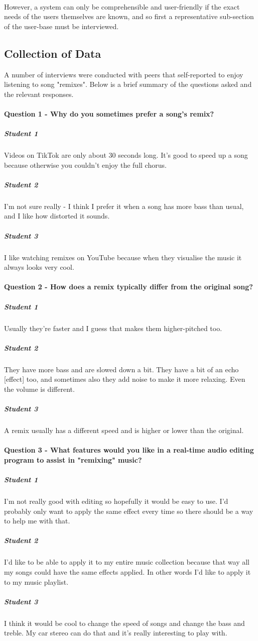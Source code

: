 \paragraph{}
However, a system can only be comprehensible and user-friendly if the exact needs of the users themselves are known, and so first a representative sub-section of the user-base must be interviewed.

\pagebreak
\subsection{Collection of Data}
A number of interviews were conducted with peers that self-reported to enjoy listening to song "remixes". Below is a brief summary of the questions asked and the relevant responses.

\paragraph{Question 1 - Why do you sometimes prefer a song's remix?}
\subparagraph{Student 1}
Videos on TikTok are only about 30 seconds long. It's good to speed up a song because otherwise you couldn't enjoy the full chorus.
\subparagraph{Student 2}
I'm not sure really - I think I prefer it when a song has more bass than usual, and I like how distorted it sounds.
\subparagraph{Student 3}
I like watching remixes on YouTube because when they visualise the music it always looks very cool.

\paragraph{Question 2 - How does a remix typically differ from the original song?}
\subparagraph{Student 1}
Usually they're faster and I guess that makes them higher-pitched too.
\subparagraph{Student 2}
They have more bass and are slowed down a bit. They have a bit of an echo {[effect]} too, and sometimes also they add noise to make it more relaxing. Even the volume is different.
\subparagraph{Student 3}
A remix usually has a different speed and is higher or lower than the original.

\paragraph{Question 3 - What features would you like in a real-time audio editing program to assist in "remixing" music?}
\subparagraph{Student 1}
I'm not really good with editing so hopefully it would be easy to use. I'd probably only want to apply the same effect every time so there should be a way to help me with that.
\subparagraph{Student 2}
I'd like to be able to apply it to my entire music collection because that way all my songs could have the same effects applied. In other words I'd like to apply it to my music playlist.
\subparagraph{Student 3}
I think it would be cool to change the speed of songs and change the bass and treble. My car stereo can do that and it's really interesting to play with.

